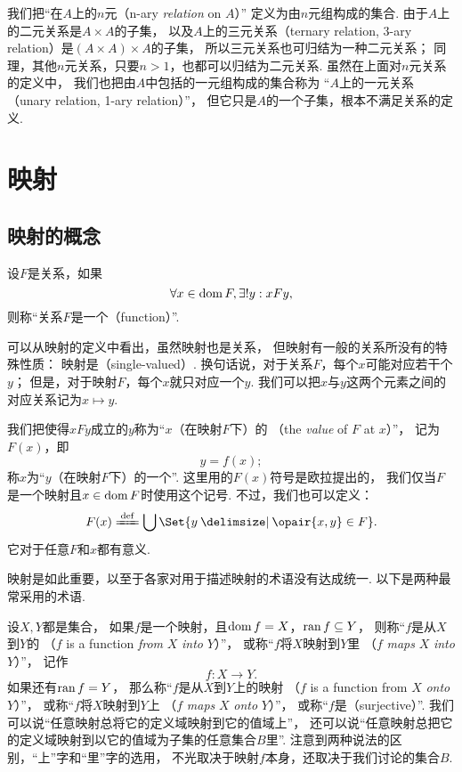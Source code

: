我们把“在\(A\)上的\(n\)元（n-ary \emph{relation} on \(A\)）”%
定义为由\(n\)元组构成的集合.
由于\(A\)上的二元关系是\(A \times A\)的子集，
以及\(A\)上的三元关系（ternary relation, 3-ary relation）是\((A \times A) \times A\)的子集，
所以三元关系也可归结为一种二元关系；
同理，其他\(n\)元关系，只要\(n>1\)，也都可以归结为二元关系.
虽然在上面对\(n\)元关系的定义中，
我们也把由\(A\)中包括的一元组构成的集合称为%
“\(A\)上的一元关系（unary relation, 1-ary relation）”，
但它只是\(A\)的一个子集，根本不满足关系的定义.

\section{映射}
\subsection{映射的概念}
\begin{definition}
设\(F\)是关系，如果\[
	\forall x \in \operatorname{dom} F, \exists! y:
	x F y,
\]
则称“关系\(F\)是一个（function）”.
\end{definition}
可以从映射的定义中看出，虽然映射也是关系，
但映射有一般的关系所没有的特殊性质：
映射是（single-valued）.
换句话说，对于关系\(F\)，每个\(x\)可能对应若干个\(y\)；
但是，对于映射\(F\)，每个\(x\)就只对应一个\(y\).
我们可以把\(x\)与\(y\)这两个元素之间的对应关系记为\(x \mapsto y\).

我们把使得\(xFy\)成立的\(y\)称为“\(x\)（在映射\(F\)下）的%
（the \emph{value} of \(F\) at \(x\)）”，
记为\(F(x)\)，即\[
	y = f(x);
\]
称\(x\)为“\(y\)（在映射\(F\)下）的一个”.
这里用的\(F(x)\)符号是欧拉提出的，
我们仅当\(F\)是一个映射且\(x\in\operatorname{dom} F\)时使用这个记号.
不过，我们也可以定义：\[
	F(x) \defeq \bigcup\Set{ y \given \opair{x,y} \in F }.
\]
它对于任意\(F\)和\(x\)都有意义.

映射是如此重要，以至于各家对用于描述映射的术语没有达成统一.
以下是两种最常采用的术语.

设\(X,Y\)都是集合，
如果\(f\)是一个映射，且\(\operatorname{dom} f = X\)，\(\operatorname{ran} f \subseteq Y\)，
则称“\(f\)是从\(X\)到\(Y\)的%
（\(f\) is a function \emph{from} \(X\) \emph{into} \(Y\)）”，
或称“\(f\)将\(X\)映射到\(Y\)里%
（\(f\) \emph{maps} \(X\) \emph{into} \(Y\)）”，
记作\[
	f\colon X \to Y.
\]
如果还有\(\operatorname{ran} f = Y\)，
那么称“\(f\)是从\(X\)到\(Y\)上的映射%
（\(f\) is a function from \(X\) \emph{onto} \(Y\)）”，
或称“\(f\)将\(X\)映射到\(Y\)上%
（\(f\) \emph{maps} \(X\) \emph{onto} \(Y\)）”，
或称“\(f\)是（surjective）”.
我们可以说“任意映射总将它的定义域映射到它的值域上”，
还可以说“任意映射总把它的定义域映射到以它的值域为子集的任意集合\(B\)里”.
注意到两种说法的区别，“上”字和“里”字的选用，
不光取决于映射\(f\)本身，还取决于我们讨论的集合\(B\).

